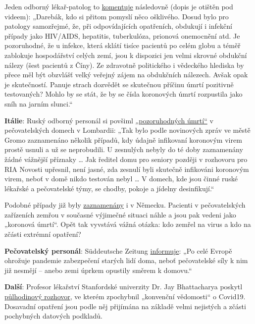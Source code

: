 Jeden odborný lékař-patolog to
\href{https://www.youtube.com/watch?v=gSn_YaOYYcY}{komentuje} následovně
(dopis je otištěn pod videem): „Darebák, kdo si přitom pomyslí něco
ošklivého. Dosud bylo pro patology samozřejmé, že, při odpovídajících
opatřeních, obdukují i infekční případy jako HIV/AIDS, hepatitis,
tuberkulóza, prionová onemocnění atd. Je pozoruhodné, že u infekce,
která sklátí tisíce pacientů po celém globu a téměř zablokuje
hospodářství celých zemí, jsou k dispozici jen velmi skrovné obdukční
nálezy (šest pacientů z Číny). Ze zdravotně politického i vědeckého
hlediska by přece měl být obzvlášť velký veřejný zájem na obdukčních
nálezech. Avšak opak je skutečností. Panuje strach dozvědět se skutečnou
příčinu úmrtí pozitivně testovaných? Mohlo by se stát, že by se čísla
koronových úmrtí rozpustila jako sníh na jarním slunci.``

\textbf{Itálie}: Ruský odborný personál si povšiml
\href{https://de.sputniknews.com/panorama/20200402326767475-fachpersonal-todesfaelle-lombardei-zeitung/}{„pozoruhodných
úmrtí``} v pečovatelských domech v Lombardii: „Tak bylo podle novinových
zpráv ve městě Gromo zaznamenáno několik případů, kdy údajně infikovaní
koronovým virem prostě usnuli a už se neprobudili. U zesnulých nebyly do
té doby zaznamenány žádné vážnější příznaky \ldots{} Jak ředitel domu
pro seniory později v rozhovoru pro RIA Novosti upřesnil, není jasné,
zda zesnulí byli skutečně infikováni koronovým virem, neboť v domě nikdo
testován nebyl \ldots{} V domech, kde jsou činné ruské lékařské a
pečovatelské týmy, se chodby, pokoje a jídelny desinfikují.``

Podobné případy již byly
\href{https://web.archive.org/web/20200330082928/https:/www.sueddeutsche.de/panorama/coronavirus-news-deutschland-wolfsburg-laschet-1.4828033}{zaznamenány}
i v Německu. Pacienti v pečovatelských zařízeních zemřou v současné
výjimečné situaci náhle a jsou pak vedeni jako „koronová úmrtí``. Opět
tak vyvstává vážná otázka: kdo zemřel na virus a kdo na zčásti extrémní
opatření?

\textbf{Pečovatelský personál}: Süddeutsche Zeitung
\href{https://www.sueddeutsche.de/politik/coronavirus-pflegekraefte-ausland-1.4866124}{informuje}:
„Po celé Evropě ohrožuje pandemie zabezpečení starých lidí doma, neboť
pečovatelské síly k nim již nesmějí -- anebo zemi úprkem opustily směrem
k domovu.``

\textbf{Další}: Profesor lékařství Stanfordské univerzity Dr. Jay
Bhattacharya poskytl
\href{https://www.youtube.com/watch?v=-UO3Wd5urg0}{půlhodinový
rozhovor}, ve kterém zpochybnil „konvenční vědomosti`` o Covid19.
Dosavadní opatření jsou podle něj přijímána na základě velmi nejistých a
zčásti pochybných datových podkladů.

